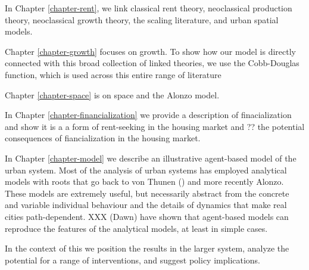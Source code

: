 In Chapter \ref{chapter-rent}, we link classical rent theory, neoclassical production theory, neoclassical growth theory, the scaling literature, and urban spatial models.

Chapter \ref{chapter-growth} focuses on growth. To show how our model is directly connected with this broad collection of linked theories, we use the Cobb-Douglas function, which is used across this entire range of literature 



Chapter \ref{chapter-space} is on space and the Alonzo model.

In Chapter \ref{chapter-financialization} we  provide a description of finacialization and show it is a a form of rent-seeking in the housing market and ?? the potential consequences of fiancialization in the housing market. 

In Chapter \ref{chapter-model} we  describe an illustrative agent-based model of the urban system. Most of the analysis of urban systems has employed analytical models with roots that go back to von Thunen () and more recently Alonzo. These models are extremely useful, but necessarily abstract from the concrete  and variable individual behaviour and  the details  of dynamics that make real cities path-dependent. XXX (Dawn) have shown that agent-based models can reproduce the features of the analytical models, at least in simple cases. 


In the context of this we position the results in the larger system, analyze the potential for a range of interventions, and suggest policy implications.



